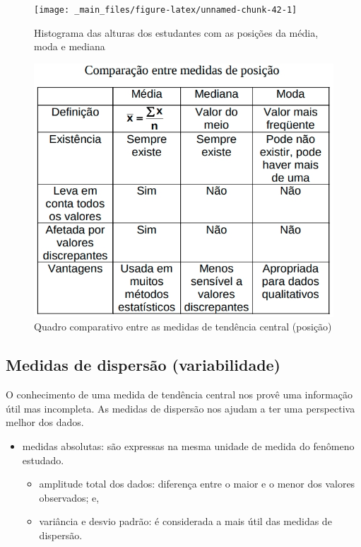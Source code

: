 \documentclass[
]{book}
\providecommand{\tightlist}{%
  \setlength{\itemsep}{0pt}\setlength{\parskip}{0pt}}
\begin{document}
\begin{figure}

{\centering \texttt{[image: \_main\_files/figure-latex/unnamed-chunk-42-1]} 

}

\caption{Histograma das alturas dos estudantes com as posições da média, moda e mediana}\label{fig:unnamed-chunk-42}
\end{figure}

\begin{figure}

{\centering \includegraphics[width=0.5\linewidth]{images3/comp_sinteses} 

}

\caption{Quadro comparativo entre as medidas de tendência central (posição)}\label{fig:unnamed-chunk-43}
\end{figure}

\hypertarget{medidas-de-dispersuxe3o-variabilidade}{%
\subsection{Medidas de dispersão (variabilidade)}\label{medidas-de-dispersuxe3o-variabilidade}}

O conhecimento de uma medida de tendência central nos provê uma informação útil mas incompleta. As medidas de dispersão nos ajudam a ter uma perspectiva melhor dos dados.

\begin{itemize}
\tightlist
\item
  medidas absolutas: são expressas na mesma unidade de medida do fenômeno estudado.

  \begin{itemize}
  \tightlist
  \item
    amplitude total dos dados: diferença entre o maior e o menor dos valores observados; e,
  \item
    variância e desvio padrão: é considerada a mais útil das medidas de dispersão.
  \end{itemize}
\end{itemize}
\end{document}
